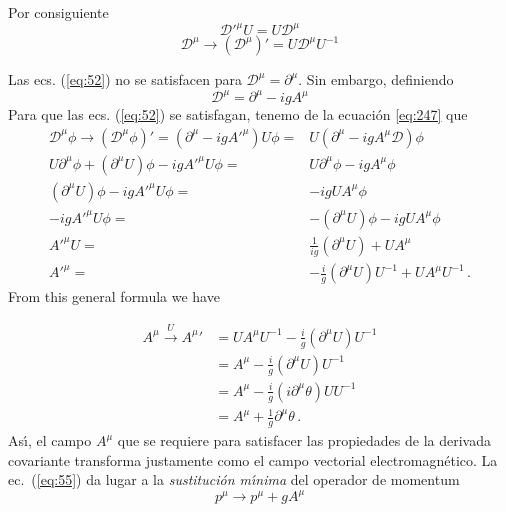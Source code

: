 Por consiguiente
\begin{equation}
  {\mathcal{D}'}^\mu U=U\mathcal{D}^\mu
\end{equation}
\begin{equation}
  \label{eq:54}
  \mathcal{D}^\mu\to\left(
    \mathcal{D}^\mu
  \right)'=U\mathcal{D}^\mu U^{-1}
\end{equation}


Las ecs. (\ref{eq:52}) no se satisfacen para $\mathcal{D}^\mu=\partial^\mu$. Sin embargo, definiendo
\begin{equation}
  \label{eq:55}
\mathcal{D}^\mu=\partial^\mu-igA^\mu
\end{equation}
Para que las ecs. (\ref{eq:52}) se satisfagan, tenemo de la ecuaci\'on \eqref{eq:247} que
\begin{align}
  \label{eq:251}
   {\mathcal{D}}^\mu\phi\to{\left({\mathcal{D}}^\mu\phi\right)}'=
  (\partial^\mu-i g {A'}^\mu) U\phi=&U(\partial^\mu-i g {A}^\mu\mathcal{D})\phi\nonumber\\
  U\partial^\mu\phi+(\partial^\mu U)\phi-i g {A'}^\mu U \phi=&U\partial^\mu\phi-i g {A}^\mu \phi\nonumber\\
  (\partial^\mu U)\phi-i g {A'}^\mu U \phi=&-i g U {A}^\mu \phi\nonumber\\
  -i g {A'}^\mu U \phi=&-(\partial^\mu U)\phi-i g U {A}^\mu \phi\nonumber\\
   {A'}^\mu U =&\frac{1}{i g}(\partial^\mu U)+ U{A}^\mu \nonumber\\
   {A'}^\mu  =&-\frac{i}{g}(\partial^\mu U)U^{-1}+ U{A}^\mu U^{-1}\,.
\end{align}
From this general formula we have

\begin{align}
  A^\mu\overset{U}{\to}{A^\mu}'&=UA^\mu U^{-1}-\frac{i}{g}(\partial^\mu U)U^{-1}\nonumber\\
  &=A^\mu-\frac{i}{g}(\partial^\mu U)U^{-1}\nonumber\\
  &=A^\mu-\frac{i}{g}\left(i\partial^\mu\theta\right)UU^{-1}\nonumber\\
  \label{eq:159}
  &= A^\mu+\frac{1}{g}\partial^\mu\theta\,.
\end{align}
As\'\i, el campo $A^\mu$ que se requiere para satisfacer las propiedades de la derivada covariante transforma justamente como el campo vectorial electromagn\'etico. La ec.~(\ref{eq:55}) da lugar a la \emph{sustituci\'on m\'\i nima} del operador de momentum
\begin{equation}
  p^\mu\to p^\mu+gA^\mu
\end{equation}

